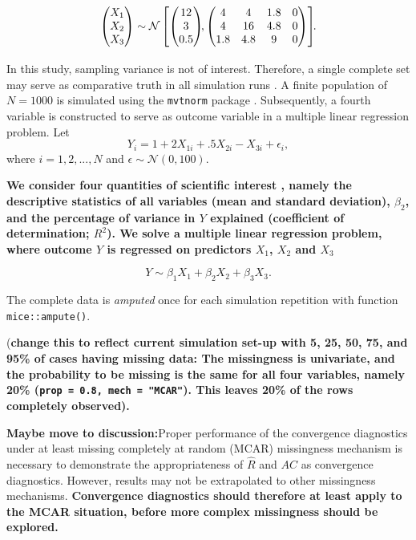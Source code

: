 \documentclass[Royal,times,sageh]{sagej}
\begin{document}
\begin{align*}
\begin{pmatrix}X_1\\
X_2\\
X_3
\end{pmatrix} \sim \mathcal{N}
\begin{bmatrix}
\begin{pmatrix}
12\\
3\\
0.5
\end{pmatrix}\!\!,
\begin{pmatrix}
4 & 4 & 1.8 & 0\\
4 & 16 & 4.8 & 0\\
1.8 & 4.8 & 9 & 0
\end{pmatrix}
\end{bmatrix}\!\!\text{.}\\[2\jot]
\end{align*} In this study, sampling variance is not of interest.
Therefore, a single complete set may serve as comparative truth in all
simulation runs \citep{vink14}. A finite population of \(N=1000\) is
simulated using the \texttt{mvtnorm} package \citep{mvtnorm}.
Subsequently, a fourth variable is constructed to serve as outcome
variable in a multiple linear regression problem. Let \[
Y_i = 1 + 2X_{1i} +.5X_{2i} - X_{3i} + \epsilon_i ,
\] where \(i = 1, 2,..., N\) and \(\epsilon \sim \mathcal{N}(0, 100)\).

\textbf{We consider four quantities of scientific interest
\citep[`conceptual estimands';][]{morr19}, namely the descriptive
statistics of all variables (mean and standard deviation), \(\beta_2\),
and the percentage of variance in \(Y\) explained (coefficient of
determination; \(R^2\)). We solve a multiple linear regression problem,
where outcome \(Y\) is regressed on predictors \(X_1\), \(X_2\) and
\(X_3\)}

\[Y \sim \beta_1 X_1 + \beta_2 X_2 + \beta_3 X_3.\]

The complete data is \emph{amputed} once for each simulation repetition
with function \texttt{mice::ampute()}.

(\textbf{change this to reflect current simulation set-up with 5, 25,
50, 75, and 95\% of cases having missing data: The missingness is
univariate, and the probability to be missing is the same for all four
variables, namely 20\% (\texttt{prop\ =\ 0.8,\ mech\ =\ "MCAR"}). This
leaves 20\% of the rows completely observed). }

\textbf{Maybe move to discussion:}Proper performance of the convergence
diagnostics under at least missing completely at random (MCAR)
missingness mechanism is necessary to demonstrate the appropriateness of
\(\widehat{R}\) and \(AC\) as convergence diagnostics. However, results
may not be extrapolated to other missingness mechanisms.
\textbf{Convergence diagnostics should therefore at least apply to the
MCAR situation, before more complex missingness should be explored.}
\end{document}
